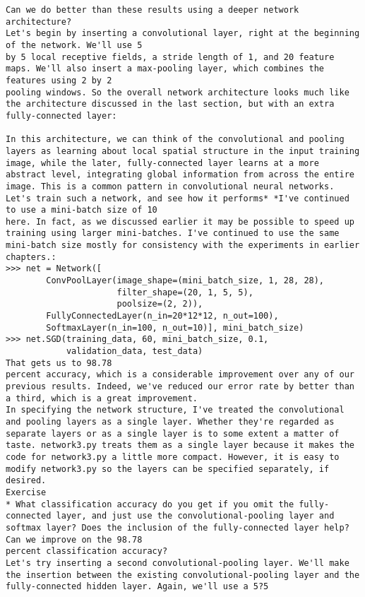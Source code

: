 \begin{lstlisting}
Can we do better than these results using a deeper network architecture?
Let's begin by inserting a convolutional layer, right at the beginning of the network. We'll use 5
by 5 local receptive fields, a stride length of 1, and 20 feature maps. We'll also insert a max-pooling layer, which combines the features using 2 by 2
pooling windows. So the overall network architecture looks much like the architecture discussed in the last section, but with an extra fully-connected layer:

In this architecture, we can think of the convolutional and pooling layers as learning about local spatial structure in the input training image, while the later, fully-connected layer learns at a more abstract level, integrating global information from across the entire image. This is a common pattern in convolutional neural networks.
Let's train such a network, and see how it performs* *I've continued to use a mini-batch size of 10
here. In fact, as we discussed earlier it may be possible to speed up training using larger mini-batches. I've continued to use the same mini-batch size mostly for consistency with the experiments in earlier chapters.:
>>> net = Network([
        ConvPoolLayer(image_shape=(mini_batch_size, 1, 28, 28), 
                      filter_shape=(20, 1, 5, 5), 
                      poolsize=(2, 2)),
        FullyConnectedLayer(n_in=20*12*12, n_out=100),
        SoftmaxLayer(n_in=100, n_out=10)], mini_batch_size)
>>> net.SGD(training_data, 60, mini_batch_size, 0.1, 
            validation_data, test_data)   
That gets us to 98.78
percent accuracy, which is a considerable improvement over any of our previous results. Indeed, we've reduced our error rate by better than a third, which is a great improvement.
In specifying the network structure, I've treated the convolutional and pooling layers as a single layer. Whether they're regarded as separate layers or as a single layer is to some extent a matter of taste. network3.py treats them as a single layer because it makes the code for network3.py a little more compact. However, it is easy to modify network3.py so the layers can be specified separately, if desired.
Exercise
* What classification accuracy do you get if you omit the fully-connected layer, and just use the convolutional-pooling layer and softmax layer? Does the inclusion of the fully-connected layer help? 
Can we improve on the 98.78
percent classification accuracy?
Let's try inserting a second convolutional-pooling layer. We'll make the insertion between the existing convolutional-pooling layer and the fully-connected hidden layer. Again, we'll use a 5?5

\end{lstlisting}
